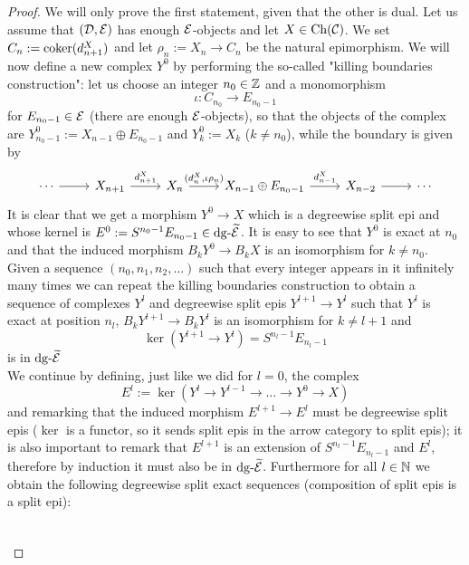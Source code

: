 \begin{proof}
    We will only prove the first statement, given that the other is dual. Let us assume that $(\mathcal{D}, \mathcal{E})$ has enough $\mathcal{E}$-objects and let $X \in \mathrm{Ch}(\mathcal{C})$. We set $C_n := \operatorname{coker}(d_{n+1}^X)$ and let $\rho_n := X_{n} \longrightarrow C_n$ be the natural epimorphism. We will now define a new complex $Y^0$ by performing the so-called "killing boundaries construction": let us choose an integer $n_0 \in \mathbb{Z}$ and a monomorphism \[\iota \colon C_{n_0} \longrightarrow E_{n_0-1}\] for $E_{n_0-1} \in \mathcal{E}$ (there are enough $\mathcal{E}$-objects), so that the objects of the complex are $Y^0_{n_0-1} := X_{n-1} \oplus E_{n_0-1}$ and $Y^0_k := X_k$ ($k \neq n_0$), while the boundary  is given by 
    \[\begin{tikzcd}
        \cdots & {X_{n+1}} & {X_n} & {X_{n-1} \oplus E_{n_0-1}} & {X_{n-2}} & \cdots
        \arrow[from=1-1, to=1-2]
        \arrow["{d^X_{n+1}}", from=1-2, to=1-3]
        \arrow["{(d^X_{n}, \iota \rho_n)}", from=1-3, to=1-4]
        \arrow["{d^X_{n-1}}", from=1-4, to=1-5]
        \arrow[from=1-5, to=1-6]
    \end{tikzcd}\]
    It is clear that we get a morphism $Y^0 \longrightarrow X$ which is a degreewise split epi and whose kernel is $E^0 := S^{n_0-1}E_{n_0 -1} \in \mathrm{dg} \text{-}\widetilde{\mathcal{E}}$. It is easy to see that  $Y^0$ is exact at $n_0$ and that the induced morphism $B_kY^0 \longrightarrow B_k X$ is an isomorphism for $k \neq n_0$. Given a sequence $(n_0, n_1, n_2, \dots)$ such that every integer appears in it infinitely many times we can repeat the killing boundaries construction to obtain a sequence of complexes $Y^l$ and degreewise split epis $Y^{l+1} \longrightarrow Y^l$ such that $Y^l$ is exact at position $n_l$, $B_kY^{l+1} \longrightarrow B_k Y^l$ is an isomorphism for $k \neq l+1$ and \[\ker(Y^{l+1} \longrightarrow Y^l) = S^{n_l-1}E_{n_l -1} \] is in $\mathrm{dg} \text{-}\widetilde{\mathcal{E}}$\\
    We continue by defining, just like we did for $l=0$, the complex
    \[E^l := \ker(Y^l \longrightarrow Y^{l-1} \longrightarrow \dots \longrightarrow Y^0 \longrightarrow X)\]
    and remarking that the induced morphism $E^{l+1} \longrightarrow E^l$ must be degreewise split epis ($\ker$ is a functor, so it sends split epis in the arrow category to split epis); it is also important to remark that $E^{l+1}$ is an extension of $S^{n_l-1}E_{n_l -1}$ and $E^l$, therefore by induction it must also be in $\mathrm{dg} \text{-}\widetilde{\mathcal{E}}$. Furthermore for all $l\in \mathbb{N}$ we obtain the following degreewise split exact sequences (composition of split epis is a split epi):
    \[\begin{tikzcd}

\end{tikzcd}\]
\end{proof}
